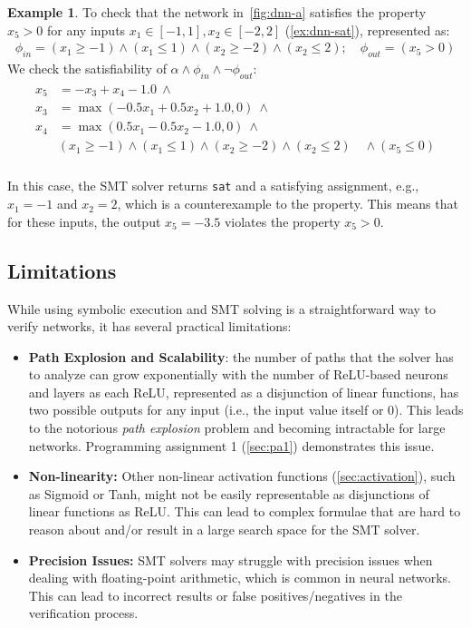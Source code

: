 \documentclass[oneside,11pt,dvipsnames]{book}
\numberwithin{equation}{section}
\theoremstyle{definition}
\newtheorem{example}{Example}[section]
\theoremstyle{remark}
\newcommand{\sat}{\texttt{sat}}
\begin{document}
\begin{example}\label{ex:smt-dnn}
    To check that the network in~\autoref{fig:dnn-a} satisfies the property $x_5 > 0$ for any inputs $x_1 \in [-1,1], x_2\in[-2,2]$ (\autoref{ex:dnn-sat}), represented as:
\begin{align*}
\phi_{in} = (x_1 \ge -1) \land (x_1 \le 1) \land (x_2 \ge -2) \land (x_2 \le 2); \quad \phi_{out} = (x_5 > 0)
\end{align*}
We check the satisfiability of $\alpha \land \phi_{in} \land \neg \phi_{out}$:
\begin{align*}
\begin{split}
x_5 &= -x_3 + x_4 - 1.0 ~\land \\
x_3 &= \max(-0.5x_1 + 0.5x_2 + 1.0, 0) ~\land \\
x_4 &= \max(0.5x_1 - 0.5x_2 - 1.0, 0) ~\land \\
    &(x_1 \ge -1) \land (x_1 \le 1) \land (x_2 \ge -2) \land (x_2 \le 2) \quad \land
    (x_5 \le 0) \\
    \end{split}
\end{align*}

In this case, the SMT solver returns \sat{} and a satisfying assignment, e.g., $x_1=-1$ and $x_2=2$, which is a counterexample to the property. This means that for these inputs, the output $x_5 = -3.5$ violates the property $x_5 > 0$.
\end{example}

\subsection{Limitations}\label{sec:smt-limitations}

While using symbolic execution and SMT solving is a straightforward way to verify networks, it has several practical limitations:
\begin{itemize}
    \item \textbf{Path Explosion and Scalability}: the number of paths that the solver has to analyze can grow exponentially with the number of ReLU-based neurons and layers as each ReLU, represented as a disjunction of linear functions, has two possible outputs for any input (i.e., the input value itself or 0).  This leads to the notorious \emph{path explosion} problem and becoming intractable for large networks. Programming assignment 1 (\autoref{sec:pa1}) demonstrates this issue.

    \item \textbf{Non-linearity:} Other non-linear activation functions (\autoref{sec:activation}), such as Sigmoid or Tanh, might not be easily representable as disjunctions of linear functions as ReLU. This can lead to complex formulae that are hard to reason about and/or result in a large search space for the SMT solver.

    \item \textbf{Precision Issues:} SMT solvers may struggle with precision issues when dealing with floating-point arithmetic, which is common in neural networks. This can lead to incorrect results or false positives/negatives in the verification process.
\end{itemize}
\end{document}
